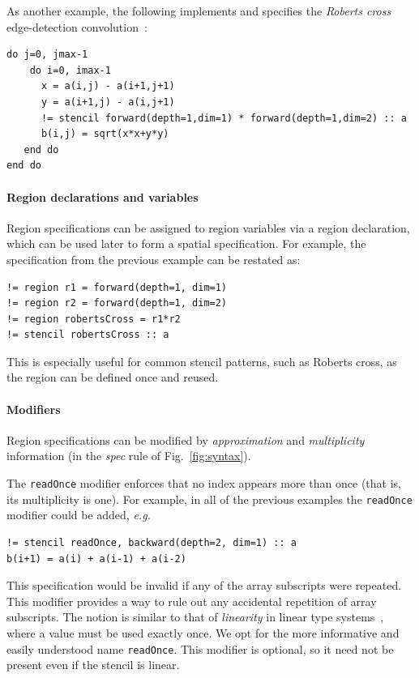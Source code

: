 \documentclass[9pt]{sigplanconf}
\theoremstyle{definition}
\newcommand{\eg}{\emph{e.g.}}
\begin{document}
As another example, the following
implements and specifies the \emph{Roberts cross}
edge-detection convolution~\cite{davis1975survey}:
\begin{verbatim}
do j=0, jmax-1
    do i=0, imax-1
      x = a(i,j) - a(i+1,j+1)
      y = a(i+1,j) - a(i,j+1)
      != stencil forward(depth=1,dim=1) * forward(depth=1,dim=2) :: a
      b(i,j) = sqrt(x*x+y*y)
   end do
end do
\end{verbatim}

\paragraph{Region declarations and variables}

Region specifications can be assigned to region variables via
a region declaration, which can be used later to form a spatial
specification. For example, the specification from the previous
 example can be restated as:
\begin{verbatim}
!= region r1 = forward(depth=1, dim=1)
!= region r2 = forward(depth=1, dim=2)
!= region robertsCross = r1*r2
!= stencil robertsCross :: a
\end{verbatim}
This is especially useful for common stencil patterns, such as Roberts cross,
as the region can be defined once and reused.
\paragraph{Modifiers}
Region specifications can be modified 
by \emph{approximation} and \emph{multiplicity} information 
(in the \textit{spec} rule of Fig.~\ref{fig:syntax}). 

The \texttt{readOnce} modifier enforces that no index appears more
than once (that is, its multiplicity is one). For example, in all of
the previous examples the \texttt{readOnce} modifier could be added,
\eg{}
%
\begin{verbatim}
!= stencil readOnce, backward(depth=2, dim=1) :: a
b(i+1) = a(i) + a(i-1) + a(i-2)
\end{verbatim}
%
This specification would be invalid if any of the
array subscripts were repeated. This modifier provides a way to
rule out any accidental repetition of array subscripts.
The notion is similar to that of \emph{linearity} in linear type
systems~\cite{wadler1990linear}, where a value must be used
exactly once. We opt for the more informative and easily understood name
\texttt{readOnce}. This modifier is optional, so it need not
be present even if the stencil is linear.
\end{document}
